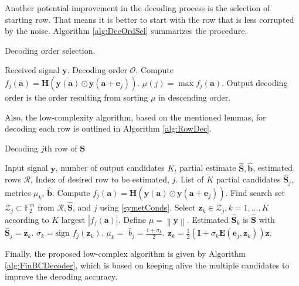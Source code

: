 \documentclass[lettersize,journal,onecolumn]{IEEEtran}
\begin{document}
\noindent Another potential improvement in the decoding process is the selection of starting row. That means it is better to start with the row that is less corrupted by the noise. Algorithm \ref{alg:DecOrdSel} summarizes the procedure.
\begin{algorithm}
	\caption{Decoding order selection.}\label{alg:DecOrdSel}
	\begin{algorithmic}[1]
		\Require Received signal $\mathbf{y}$.
		\Ensure Decoding order $\mathcal{O}$.
		\State Compute $f_j(\mathbf{a}) = \mathbf{H} \left(\overline{\mathbf{y}(\mathbf{a})} \odot \mathbf{y}\left(\mathbf{a+e}_j\right) \right)$.
		\State $\mu \left(j\right) = \max{f_j\left(\mathbf{a}\right)}$.
		\EndFor{}
		\State Output decoding order is  the order resulting from sorting $\mu$ in descending order.
	\end{algorithmic}
\end{algorithm}
Also, the low-complexity algorithm, based on the mentioned lemmas, for decoding each row is outlined in Algorithm \ref{alg:RowDec}.
 \begin{algorithm}
 	\caption{Decoding $j$th row of $\mathbf{S}$}\label{alg:RowDec}
 	\begin{algorithmic}[1]
 		\Require Input signal $\mathbf{y}$, number of output candidates $K$, partial estimate $\widehat{\mathbf{S}}, \widehat{\mathbf{b}}$, estimated rows $\mathcal{R}$, Index of desired row to be estimated, $j$.
 		\Ensure List of $K$ partial candidates $\widehat{\mathbf{S}}_j$, metrics $\mu_k$, $\widehat{\mathbf{b}}$.
 		\State Compute $f_j(\mathbf{a}) = \mathbf{H}\left(\overline{\mathbf{y}(\mathbf{a})} \odot \mathbf{y}\left(\mathbf{a+e}_j\right) \right)$.
 		\State Find search set $\mathcal{Z}_j\subset \mathbb{F}_2^m$ from $\mathcal{R}, \widehat{\mathbf{S}}$, and $j$ using \eqref{symetConds}.
 		\State Select $\mathbf{z}_k \in \mathcal{Z}_j, k=1,...,K$ according to $K$ largest $\left\lvert f_j(\mathbf{a}) \right\rvert$.
 		\State Define $\mu = \left\lVert \mathbf{y} \right\rVert$.
 		\State Estimated $\widehat{\mathbf{S}}_k$ is $\widehat{\mathbf{S}}$ with $\widehat{\mathbf{S}}_j = \mathbf{z}_k$.
 		\State $\sigma_k = \text{sign }f_j(\mathbf{z}_k)$.
 		\State $\mu_k = $
 		\State $\widehat{b}_j = \frac{1+\sigma_k}{2}$.
 		\State $\mathbf{z}_k = \frac{1}{2}\left(\mathbf{I}+\sigma_k \mathbf{E}\left(\mathbf{e}_j, \mathbf{z}_k\right)\right) \mathbf{z}$. 
 		\EndFor{}
 	\end{algorithmic}
 \end{algorithm}
 Finally, the proposed low-complex algorithm is given by Algorithm \ref{alg:FinBCDecoder}, which is based on keeping alive the multiple candidates to improve the decoding accuracy.
\end{document}
